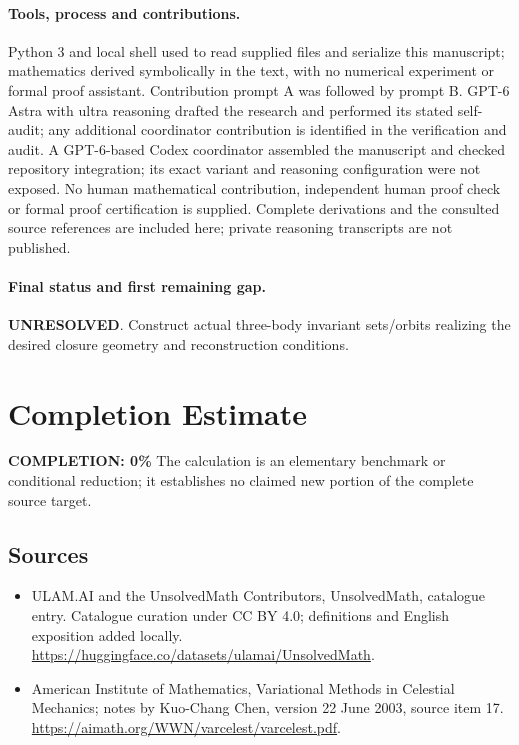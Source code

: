 \documentclass[11pt]{article}
\begin{document}
\paragraph{Tools, process and contributions.}
Python 3 and local shell used to read supplied files and serialize this manuscript; mathematics derived symbolically in the text, with no numerical experiment or formal proof assistant. Contribution prompt A was followed by prompt B. GPT-6 Astra with ultra reasoning drafted the research and performed its stated self-audit; any additional coordinator contribution is identified in the verification and audit. A GPT-6-based Codex coordinator assembled the manuscript and checked repository integration; its exact variant and reasoning configuration were not exposed. No human mathematical contribution, independent human proof check or formal proof certification is supplied. Complete derivations and the consulted source references are included here; private reasoning transcripts are not published.

\paragraph{Final status and first remaining gap.}
\textbf{UNRESOLVED}. Construct actual three-body invariant sets/orbits realizing the desired closure geometry and reconstruction conditions.

\section{Completion Estimate}
\noindent\textbf{COMPLETION: 0\%}
The calculation is an elementary benchmark or conditional reduction; it establishes no claimed new portion of the complete source target.

\subsection{Sources}
\begin{itemize}
\item[\hypertarget{source:statement:1}{S1}] ULAM.AI and the UnsolvedMath Contributors, UnsolvedMath, catalogue entry. Catalogue curation under CC BY 4.0; definitions and English exposition added locally.
\url{https://huggingface.co/datasets/ulamai/UnsolvedMath}.
\item[\hypertarget{source:statement:2}{S2}] American Institute of Mathematics, Variational Methods in Celestial Mechanics; notes by Kuo-Chang Chen, version 22 June 2003, source item 17.
\url{https://aimath.org/WWN/varcelest/varcelest.pdf}.
\end{itemize}
\label{end:statement}
\end{document}
